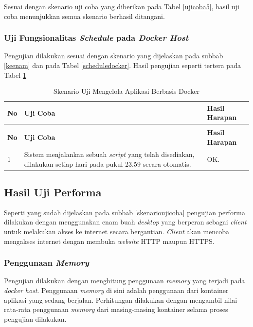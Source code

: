 Sesuai dengan skenario uji coba yang diberikan pada Tabel \ref{ujicoba5}, hasil uji coba menunjukkan semua skenario berhasil ditangani.

\subsubsection{Uji Fungsionalitas \textit{Schedule} pada \textit{Docker Host}}
Pengujian dilakukan sesuai dengan skenario yang dijelaskan pada subbab \ref{keenam} dan pada Tabel \ref{scheduledocker}. Hasil pengujian seperti tertera pada Tabel \ref{hasilujicoba7}
\begin{longtable}{|p{}|p{}|p{}|}					\caption{Skenario Uji \textit{Schedule} pada \textit{Docker Host}} \label{hasilujicoba7} \\
	\hline
	\textbf{No} & \textbf{Uji Coba} & \textbf{Hasil Harapan} \\ \hline
	\endfirsthead
	\caption[]{Skenario Uji Mengelola Aplikasi Berbasis Docker} \\
	\hline
	\textbf{No} & \textbf{Uji Coba} & \textbf{Hasil Harapan} \\ \hline
	\endhead
	\endfoot
	\endlastfoot
	
	1 & Sistem menjalankan sebuah \textit{script} yang telah disediakan, dilakukan setiap hari pada pukul 23.59 secara otomatis. & OK. \\ \hline
\end{longtable}

\subsection{Hasil Uji Performa}
Seperti yang sudah dijelaskan pada subbab \ref{skenarioujicoba} pengujian performa dilakukan dengan menggunakan enam buah \textit{desktop} yang berperan sebagai \textit{client} untuk melakukan akses ke internet secara bergantian. \textit{Client} akan mencoba mengakses internet dengan membuka \textit{website} HTTP maupun HTTPS.

\subsubsection{Penggunaan \textit{Memory}}
Pengujian dilakukan dengan menghitung penggunaan \textit{memory} yang terjadi pada \textit{docker host}. Penggunaan \textit{memory} di sini adalah penggunaan dari kontainer aplikasi yang sedang berjalan. Perhitungan dilakukan dengan mengambil nilai rata-rata penggunaan \textit{memory} dari masing-masing kontainer selama proses pengujian dilakukan.

